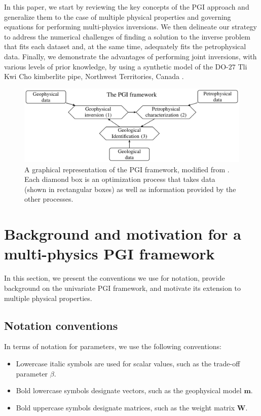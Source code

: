 \documentclass[extra, mreferee]{gji_joint} %
\begin{document}
In this paper, we start by reviewing the key concepts of the PGI approach and generalize them to the case of multiple physical properties and governing equations for performing multi-physics inversions. We then delineate our strategy to address the numerical challenges of finding a solution to the inverse problem that fits each dataset and, at the same time, adequately fits the petrophysical data. Finally, we demonstrate the advantages of performing joint inversions, with various levels of prior knowledge, by using a synthetic model of the DO-$27$ Tli Kwi Cho kimberlite pipe, Northwest Territories, Canada \citep{JansenEtAl2004}.

\begin{figure}
    \includegraphics[width=\columnwidth]{Fig/LowRes/New_Framework_with_numbers.png}
    \caption{A graphical representation of the PGI framework, modified from \citet{ggz389}. Each diamond box is an optimization process that takes data (shown in rectangular boxes) as well as information provided by the other processes.}
    \label{fig:Framework_with_numbers.pdf}
\end{figure}

\section{Background and motivation for a multi-physics PGI framework}

In this section, we present the conventions we use for notation, provide background on the univariate PGI framework, and motivate its extension to multiple physical properties.

\subsection{Notation conventions}

In terms of notation for parameters, we use the following conventions:

\begin{itemize}
\item Lowercase italic symbols are used for scalar values, such as the trade-off parameter $\beta$.
\item Bold lowercase symbols designate vectors, such as the geophysical model $\mathbf{m}$.
\item Bold uppercase symbols designate matrices, such as the weight matrix $\mathbf{W}$.
\end{itemize}
\end{document}
